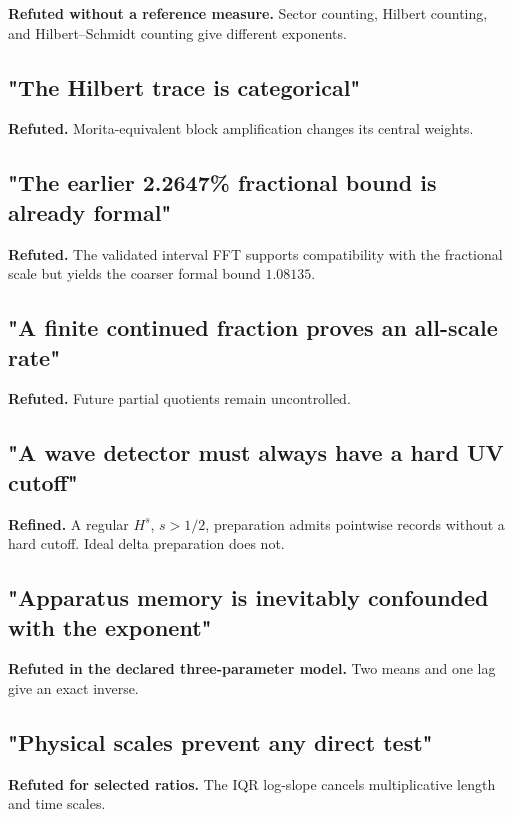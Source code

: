 \documentclass[11pt,a4paper,openany]{report}
\begin{document}
\textbf{Refuted without a reference measure.} Sector counting, Hilbert counting, and Hilbert--Schmidt counting give different exponents.

\subsection{"The Hilbert trace is categorical"}

\textbf{Refuted.} Morita-equivalent block amplification changes its central weights.

\subsection{"The earlier 2.2647\% fractional bound is already formal"}

\textbf{Refuted.} The validated interval FFT supports compatibility with the fractional scale but yields the coarser formal bound \(1.08135\).

\subsection{"A finite continued fraction proves an all-scale rate"}

\textbf{Refuted.} Future partial quotients remain uncontrolled.

\subsection{"A wave detector must always have a hard UV cutoff"}

\textbf{Refined.} A regular \(H^s\), \(s>1/2\), preparation admits pointwise records without a hard cutoff. Ideal delta preparation does not.

\subsection{"Apparatus memory is inevitably confounded with the exponent"}

\textbf{Refuted in the declared three-parameter model.} Two means and one lag give an exact inverse.

\subsection{"Physical scales prevent any direct test"}

\textbf{Refuted for selected ratios.} The IQR log-slope cancels multiplicative length and time scales.
\end{document}
